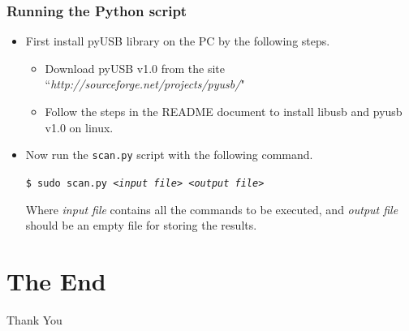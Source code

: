 \documentclass{beamer}
\begin{document}
\begin{frame}
\frametitle{Running the Python script}
\begin{itemize}
\item First install pyUSB library on the PC by the following steps.

\begin{itemize}
\item Download pyUSB v1.0 from the site ``\textit{http://sourceforge.net/projects/pyusb/}"
\item Follow the steps in the README document to install libusb and pyusb v1.0 on linux.
\end{itemize}

\item Now run the \texttt{scan.py} script with the following command.
\vspace*{0.5cm}
\begin{center}
\texttt{\$ sudo scan.py \textit{<input file>} \textit{<output file>}} 
\end{center}
\vspace*{0.5cm}
Where \textit{input file} contains all the commands to be executed, and \textit{output file} should be an empty file for storing the results.
\end{itemize}

\end{frame}

\section{The End}
\begin{frame}
\Huge{\centerline{Thank You}}
\end{frame}

\end{document}
